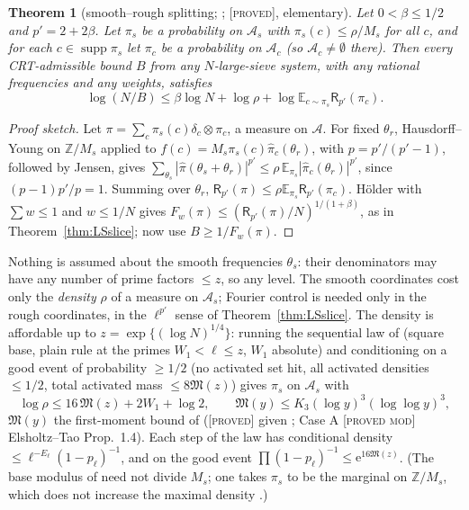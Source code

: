 \documentclass[10pt,reqno]{amsart}
\newtheorem{theorem}{Theorem}[section]
\theoremstyle{definition}
\theoremstyle{remark}
\newcommand{\A}{\mathcal A}
\newcommand{\E}{\mathbb E}
\newcommand{\Z}{\mathbb Z}
\newcommand{\e}{\mathrm e}
\newcommand{\lab}[1]{\textup{[\textsc{#1}]}}
\begin{document}
\begin{theorem}[smooth--rough splitting; {\cite[Thm~1.1]{LS3}}; \lab{proved}, elementary]\label{thm:smoothrough}
Let $0<\beta\leq1/2$ and $p'=2+2\beta$.  Let $\pi_s$ be a probability on $\A_s$ with
$\pi_s(c)\leq\rho/M_s$ for all $c$, and for each $c\in\operatorname{supp}\pi_s$ let $\pi_c$
be a probability on $\A_c$ (so $\A_c\neq\emptyset$ there).  Then every
CRT-admissible bound $B$ from any $N$-large-sieve system, with any rational
frequencies and any weights, satisfies
\[
 \log(N/B)\leq\beta\log N+\log\rho+\log\E_{c\sim\pi_s}\mathsf R_{p'}(\pi_c).
\]
\end{theorem}
\begin{proof}[Proof sketch]
Let $\pi=\sum_c\pi_s(c)\delta_c\otimes\pi_c$, a measure on $\A$.  For fixed $\theta_r$,
Hausdorff--Young on $\Z/M_s$ applied to $f(c)=M_s\pi_s(c)\hat\pi_c(\theta_r)$, with
$p=p'/(p'-1)$, followed by Jensen, gives
$\sum_{\theta_s}|\hat\pi(\theta_s+\theta_r)|^{p'}\leq\rho\,\E_{\pi_s}|\hat\pi_c(\theta_r)|^{p'}$, since $(p-1)p'/p=1$.  Summing
over $\theta_r$, $\mathsf R_{p'}(\pi)\leq\rho\E_{\pi_s}\mathsf R_{p'}(\pi_c)$.  H\"older with $\sum w\leq1$ and
$w\leq1/N$ gives $F_w(\pi)\leq(\mathsf R_{p'}(\pi)/N)^{1/(1+\beta)}$, as in
Theorem~\ref{thm:LSslice}; now use $B\geq1/F_w(\pi)$.
\end{proof}
Nothing is assumed about the smooth frequencies $\theta_s$: their
denominators may have any number of prime factors $\leq z$, so any level.
The smooth coordinates cost only the \emph{density} $\rho$ of a measure on
$\A_s$; Fourier control is needed only in the rough coordinates, in the
$\ell^{p'}$ sense of Theorem~\ref{thm:LSslice}.  The density is affordable up
to $z=\exp\{(\log N)^{1/4}\}$: running the sequential law of \cite{KA2} (square
base, plain rule at the primes $W_1<\ell\leq z$, $W_1$ absolute) and conditioning
on a good event of probability $\geq1/2$ (no activated set hit, all
activated densities $\leq1/2$, total activated mass $\leq8\mathfrak M(z)$) gives
$\pi_s$ on $\A_s$ with
\[
 \log\rho\leq16\,\mathfrak M(z)+2W_1+\log2,\qquad \mathfrak M(y)\leq K_3(\log y)^3(\log\log y)^3,
\]
$\mathfrak M(y)$ the first-moment bound of \cite[\S3, Cor.~3.7]{KA2}
\cite[Lemma~2.1]{LS3} (\lab{proved} given \cite[\S\S2--4]{KA2}; Case A
\lab{proved mod} Elsholtz--Tao Prop.~1.4).  Each step of the law has
conditional density $\leq\ell^{-E_\ell}(1-p_\ell)^{-1}$, and on the good event
$\prod(1-p_\ell)^{-1}\leq\e^{16\mathfrak M(z)}$.  (The base modulus of \cite{KA2} need not divide
$M_s$; one takes $\pi_s$ to be the marginal on $\Z/M_s$, which does not increase the
maximal density \cite[Lemma~2.1]{LS3}.)
\end{document}
